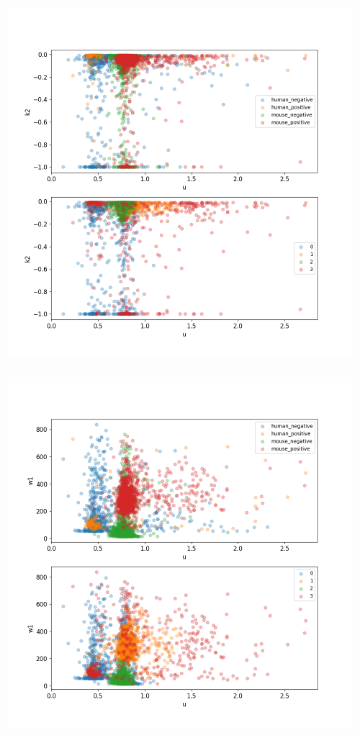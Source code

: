 \begin{figure}
\begin{subfigure}{0.45\textwidth}
	\end{subfigure}
	\hfill
	\begin{subfigure}{0.45\textwidth}
		\includegraphics[width=\textwidth]{fig/seperate_u_k2}
	\end{subfigure}
	\hfill
	\begin{subfigure}{0.45\textwidth}
		\includegraphics[width=\textwidth]{fig/seperate_u_w1}

\end{subfigure}
\end{figure}
